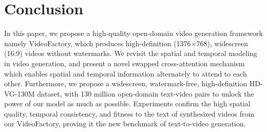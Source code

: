 \documentclass{article}
\begin{document}
\section{Conclusion}
In this paper, we propose a high-quality open-domain video generation framework namely VideoFactory, which produces high-definition (1376$\times$768), widescreen (16:9) videos without watermarks.
We revisit the spatial and temporal modeling in video generation, and present a novel swapped cross-attention mechanism which enables spatial and temporal information alternately to attend to each other.
Furthermore, we propose a widescreen, watermark-free, high-definition HD-VG-130M dataset, with 130 million open-domain text-video pairs to unlock the power of our model as much as possible.
Experiments confirm the high spatial quality, temporal consistency, and fitness to the text of synthesized videos from our VideoFactory, proving it the new benchmark of text-to-video generation.



\end{document}
